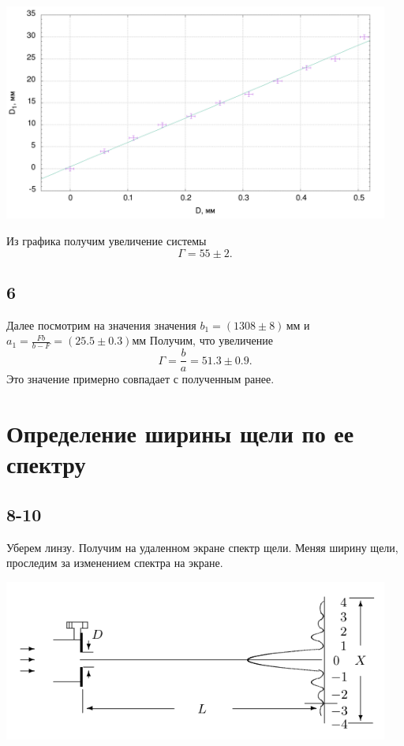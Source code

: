 \begin{center}
\includegraphics[width=0.95\textwidth]{plot1.png}
\end{center}

Из графика получим увеличение системы
\[\Gamma = 55\pm2.\]

\subsection*{6}
Далее посмотрим на значения значения $b_1=(1308\pm8)\,\text{мм}$ и $a_1 = \frac{Fb}{b-F} = (25.5\pm0.3) \text{мм}$ Получим, что увеличение
\[\Gamma = \frac{b}{a} = 51.3\pm0.9.\]
Это значение примерно совпадает с полученным ранее.

\section*{Определение ширины щели по ее спектру}
\subsection*{8-10}
Уберем линзу. Получим на удаленном экране спектр щели. Меняя ширину щели, проследим за изменением спектра на экране.

\begin{center}
\includegraphics[width=0.95\textwidth]{2.png}
\end{center}

